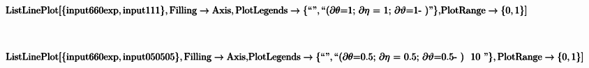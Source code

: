 \documentclass{article}
\newcommand{\unicode}[1]{{}}
\begin{document}
\begin{doublespace}
\noindent\(\begin{array}{cc}
  &  \\
\end{array}\)
\end{doublespace}

\begin{doublespace}
\noindent\(\pmb{\text{ListLinePlot}[\{\text{input660exp}, \text{input111}\},\text{Filling}\to \text{Axis}, \text{PlotLegends}\to \{\text{{``}$\unicode{042d}\unicode{043a}\unicode{0441}\unicode{043f}\unicode{0435}\unicode{0440}\unicode{0438}\unicode{043c}\unicode{0435}\unicode{043d}\unicode{0442}${''}},\text{{``}$\unicode{0422}\unicode{0435}\unicode{043e}\unicode{0440}\unicode{0438}\unicode{044f}$($\partial
\theta $=1; $\partial \eta $ = 1; $\partial \vartheta $=1-$\unicode{0432}\unicode{043d}\unicode{0435}\unicode{0448}\unicode{043d}\unicode{0438}\unicode{0439}$
$\unicode{0446}\unicode{0438}\unicode{043a}\unicode{043b}$){''}}\},}\\
\pmb{\text{PlotRange}\to \{0,1\}]}\)
\end{doublespace}

\begin{doublespace}
\noindent\(\begin{array}{cc}
  &  \\
\end{array}\)
\end{doublespace}

\begin{doublespace}
\noindent\(\pmb{\text{ListLinePlot}[\{\text{input660exp}, \text{input050505}\},\text{Filling}\to \text{Axis}, }\\
\pmb{\text{PlotLegends}\to \{\text{{``}$\unicode{042d}\unicode{043a}\unicode{0441}\unicode{043f}\unicode{0435}\unicode{0440}\unicode{0438}\unicode{043c}\unicode{0435}\unicode{043d}\unicode{0442}${''}},\text{{``}$\unicode{0422}\unicode{0435}\unicode{043e}\unicode{0440}\unicode{0438}\unicode{044f}$($\partial
\theta $=0.5; $\partial \eta $ = 0.5; $\partial \vartheta $=0.5-$\unicode{0432}\unicode{043d}\unicode{0435}\unicode{0448}\unicode{043d}\unicode{0438}\unicode{0439}$
$\unicode{0446}\unicode{0438}\unicode{043a}\unicode{043b}$) $\unicode{0432}\unicode{0440}\unicode{0435}\unicode{043c}\unicode{044f}$ 10 $\unicode{043c}\unicode{0438}\unicode{043d}${''}}\},\text{PlotRange}\to
\{0,1\}]}\)
\end{doublespace}

\begin{doublespace}
\noindent\(\begin{array}{cc}
  &  \\
\end{array}\)
\end{doublespace}
\end{document}
